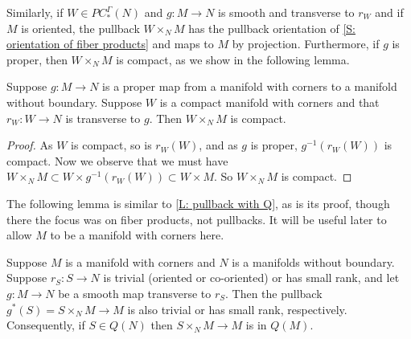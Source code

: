 Similarly, if $W \in PC_*^\Gamma(N)$ and $g \colon M \to N$ is smooth and transverse to $r_W$ and if $M$ is oriented, the pullback $W \times_N M$ has the pullback orientation of \cref{S: orientation of fiber products} and maps to $M$ by projection. 
Furthermore, if $g$ is proper, then $W \times_N M$ is compact, as we show in the following lemma.

\begin{lemma}\label{L: compact pullback}
	Suppose $g \colon M \to N$ is a proper map from a manifold with corners to a manifold without boundary. 
	Suppose $W$ is a compact manifold with corners and that $r_W \colon W \to N$ is transverse to $g$.
	Then $W \times_N M$ is compact.
\end{lemma}

\begin{proof}
	As $W$ is compact, so is $r_W(W)$, and as $g$ is proper, $g^{-1}(r_W(W))$ is compact.
	Now we observe that we must have $W \times_N M \subset W \times g^{-1}(r_W(W)) \subset W \times M$.
	So $W \times_N M$ is compact.
\end{proof}

The following lemma is similar to \cref{L: pullback with Q}, as is its proof, though there the focus was on fiber products, not pullbacks.
It will be useful later to allow $M$ to be a manifold with corners here.

\begin{comment}
	\red{GBF: Might want to try to combine those into a single lemma somewhere at some point, but it looks like it might be less messy, if a bit redundant, not to.}
\end{comment}

\begin{lemma}\label{L: pullback map Q}
	Suppose $M$ is a manifold with corners and $N$ is a manifolds without boundary.
	Suppose $r_S \colon S \to N$ is trivial (oriented or co-oriented) or has small rank, and let $g \colon M \to N$ be a smooth map transverse to $r_S$.
	Then the pullback $g^*(S) = S \times_N M \to M$ is also trivial or has small rank, respectively.
	Consequently, if $S \in Q(N)$ then $S \times_N M \to M$ is in $Q(M)$.
\end{lemma}


